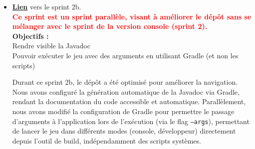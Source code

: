 \documentclass[a4paper, 12pt]{article}
\begin{document}
\begin{itemize}[itemsep=1cm]
                De plus, une vue ASCII a été implémentée afin d'avoir une représentation plus claire du jeu (carte et worms).
                La gestion de la sauvegarde et du chargement de partie a également été ajoutée.\\
                
                En résumé, ce sprint a marqué la fin de la version console avec une meilleure architecture (cf. sprint 2b) et une vue ASCII fonctionnelle.
            
            \subsection{Sprint 2b : Amélioration du dépôt (15/11 - 21/11)}
                \item \href{https://moule.informatique.u-paris.fr/mesnildr/projet-worms/-/milestones/4#tab-issues}{\textbf{Lien}} vers le sprint 2b.\\
                \textcolor{red}{\textbf{Ce sprint est un sprint parallèle, visant à améliorer le dépôt sans se mélanger avec le sprint de la version console (sprint 2).}}\\
                \newline
                \textbf{Objectifs :}\\
                    Rendre visible la Javadoc\\
                    Pouvoir exécuter le jeu avec des arguments en utilisant Gradle (et non les scripts)
                \newline

                Durant ce sprint 2b, le dépôt a été optimisé pour améliorer la navigation.
                Nous avons configuré la génération automatique de la Javadoc via Gradle, rendant la documentation du code accessible et automatique.
                Parallèlement, nous avons modifié la configuration de Gradle pour permettre le passage d'arguments à l'application lors de l'exécution (via le flag \texttt{--args}), permettant de lancer le jeu dans différents modes (console, développeur) directement depuis l'outil de build, indépendamment des scripts systèmes.
            

\end{itemize}
\end{document}
